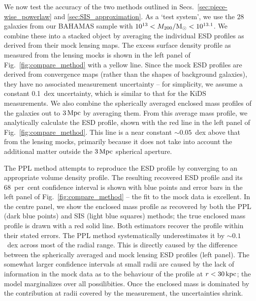 \documentclass[usenatbib]{mnras}
\begin{document}
We now test the accuracy of the two methods outlined in Secs.~\ref{sec:piece-wise_powerlaw} and \ref{sec:SIS_approximation}. As a `test system', we use the $28$ galaxies from our BAHAMAS sample with $10^{13}<M_{200}/{\rm M}_\odot<10^{13.1}$. We combine these into a stacked object by averaging the individual ESD profiles as derived from their mock lensing maps. The excess surface density profile as measured from the lensing mocks is shown in the left panel of Fig.~\ref{fig:compare_method} with a yellow line. Since the mock ESD profiles are derived from convergence maps (rather than the shapes of background galaxies), they have no associated measurement uncertainty -- for simplicity, we assume a constant 0.1~dex uncertainty, which is similar to that for the KiDS measurements. We also combine the spherically averaged enclosed mass profiles of the galaxies out to $3\,{\rm Mpc}$ by averaging them. From this average mass profile, we analytically calculate the ESD profile, shown with the red line in the left panel of Fig.~\ref{fig:compare_method}. This line is a near constant $\sim 0.05$~dex above that from the lensing mocks, primarily because it does not take into account the additional matter outside the $3\,{\rm Mpc}$ spherical aperture.

The PPL method attempts to reproduce the ESD profile by converging to an appropriate volume density profile. The resulting recovered ESD profile and its 68~per~cent confidence interval is shown with blue points and error bars in the left panel of Fig.~\ref{fig:compare_method} -- the fit to the mock data is excellent. In the centre panel, we show the enclosed mass profile as recovered by both the PPL (dark blue points) and SIS (light blue squares) methods; the true enclosed mass profile is drawn with a red solid line. Both estimators recover the profile within their stated errors. The PPL method systematically underestimates it by $\sim 0.1$~dex across most of the radial range. This is directly caused by the difference between the spherically averaged and mock lensing ESD profiles (left panel). The somewhat larger confidence intervals at small radii are caused by the lack of information in the mock data as to the behaviour of the profile at $r < 30\,{\rm kpc}$; the model marginalizes over all possilibities. Once the enclosed mass is dominated by the contribution at radii covered by the measurement, the uncertainties shrink.
\end{document}
